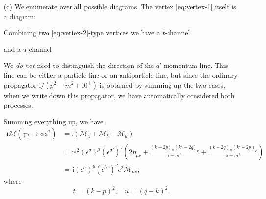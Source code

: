 \documentclass[hyperref, a4paper]{article}
\newcommand*{\ii}{\mathrm{i}}
\begin{document}
\begin{itemize}
\item[(c)] We enumerate over all possible diagrams. The vertex \eqref{eq:vertex-1} itself is a diagram:
 
Combining two \eqref{eq:vertex-2}-type vertices we have a $t$-channel

and a $u$-channel


\begin{note*}{}{}
    We \emph{do not} need to distinguish the direction of the $q'$ momentum line. This line can be either 
    a particle line or an antiparticle line, but since the ordinary propagator $\ii / (p^2 - m^2 + \ii 0^+)$ 
    is obtained by summing up the two cases, when we write down this propagator, we have automatically 
    considered both processes. 
\end{note*}

Summing everything up, we have 
\begin{equation}
    \begin{aligned}
        \ii \mathcal{M}(\gamma \gamma \to \phi \phi^*) &= \ii (\mathcal{M}_4 + \mathcal{M}_t + \mathcal{M}_u) \\
        &= \ii e^2 (\epsilon^\sigma)^\mu (\epsilon^{\sigma'})^\nu \left( 2 \eta_{\mu \nu} + \frac{(k-2p)_\mu (k'-2q)_\nu}{t - m^2} + \frac{(k-2q)_\mu (k'-2p)_\nu}{u - m^2} \right) \\
        &\eqqcolon \ii (\epsilon^\sigma)^\mu (\epsilon^{\sigma'})^\nu e^2 \mathcal{M}_{\mu \nu} ,
    \end{aligned}
    \label{eq:m-mu-nu-def-gamma-gamma}
\end{equation}
where 
\begin{equation}
    t = (k-p)^2, \quad u = (q-k)^2.
\end{equation}


\end{itemize}
\end{document}
